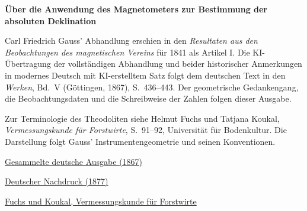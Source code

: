 \clearpage
\thispagestyle{empty}
\begin{center}\Large\textbf{Über die Anwendung des Magnetometers zur Bestimmung der absoluten Deklination}\end{center}

Carl Friedrich Gauss’ Abhandlung erschien in den \textit{Resultaten aus den Beobachtungen des magnetischen Vereins} für 1841 als Artikel I. Die KI-Übertragung der vollständigen Abhandlung und beider historischer Anmerkungen in modernes Deutsch mit KI-erstelltem Satz folgt dem deutschen Text in den \textit{Werken}, Bd.~V (Göttingen, 1867), S.~436--443. Der geometrische Gedankengang, die Beobachtungsdaten und die Schreibweise der Zahlen folgen dieser Ausgabe.

\medskip\noindent
Zur Terminologie des Theodoliten siehe Helmut Fuchs und Tatjana Koukal, \textit{Vermessungskunde für Forstwirte}, S.~91--92, Universität für Bodenkultur. Die Darstellung folgt Gauss’ Instrumentengeometrie und seinen Konventionen.

\medskip\noindent
\href{https://gdz.sub.uni-goettingen.de/id/PPN236006339}{Gesammelte deutsche Ausgabe (1867)}\par
\noindent\href{https://doi.org/10.1007/978-3-642-49319-5_21}{Deutscher Nachdruck (1877)}\par
\noindent\href{https://boku.ac.at/fileadmin/data/H03000/H85000/H85700/skripten/857143/Vermessungskunde-FW.pdf}{Fuchs und Koukal, Vermessungskunde für Forstwirte}
\clearpage

